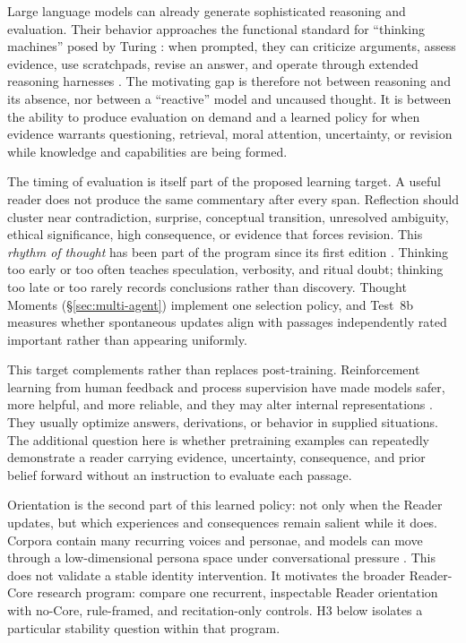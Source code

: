 \documentclass[11pt]{article}
\begin{document}
Large language models can already generate sophisticated reasoning and
evaluation. Their behavior approaches the functional standard for ``thinking
machines'' posed by Turing \cite{turing1950computing}: when prompted, they can
criticize arguments, assess evidence, use scratchpads, revise an answer, and
operate through extended reasoning harnesses
\cite{brown2020language,nye2021scratchpads,zelikman2022star,deepseek2025r1}.
The motivating gap is therefore not between reasoning and its absence, nor
between a ``reactive'' model and uncaused thought. It is between the ability to
produce evaluation on demand and a learned policy for when evidence warrants
questioning, retrieval, moral attention, uncertainty, or revision while
knowledge and capabilities are being formed.

The timing of evaluation is itself part of the proposed learning target. A
useful reader does not produce the same commentary after every span. Reflection
should cluster near contradiction, surprise, conceptual transition, unresolved
ambiguity, ethical significance, high consequence, or evidence that forces
revision. This \emph{rhythm of thought} has been part of the program since its
first edition \cite{westerberg2025superintelligence}. Thinking too early or too
often teaches speculation, verbosity, and ritual doubt; thinking too late or
too rarely records conclusions rather than discovery. Thought Moments
(\S\ref{sec:multi-agent}) implement one selection policy, and Test~8b measures
whether spontaneous updates align with passages independently rated important
rather than appearing uniformly.

This target complements rather than replaces post-training. Reinforcement
learning from human feedback and process supervision have made models safer,
more helpful, and more reliable, and they may alter internal representations
\cite{christiano2017deep,lightman2023letsverify}. They usually optimize answers,
derivations, or behavior in supplied situations. The additional question here
is whether pretraining examples can repeatedly demonstrate a reader carrying
evidence, uncertainty, consequence, and prior belief forward without an
instruction to evaluate each passage.

Orientation is the second part of this learned policy: not only when the Reader
updates, but which experiences and consequences remain salient while it does.
Corpora contain many recurring voices and personae, and models can move through a
low-dimensional persona space under conversational pressure
\cite{lu2026assistantaxissituatingstabilizing}. This does not validate a stable
identity intervention. It motivates the broader Reader-Core research program: compare one recurrent,
inspectable Reader orientation with no-Core, rule-framed, and recitation-only
controls. H3 below isolates a particular stability question within that program.
\end{document}
